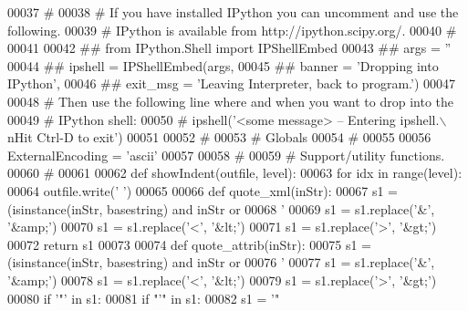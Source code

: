 \begin{DoxyCode}
{{{{00037 \textcolor{comment}{#}
00038 \textcolor{comment}{# If you have installed IPython you can uncomment and use the following.}
00039 \textcolor{comment}{# IPython is available from http://ipython.scipy.org/.}
00040 \textcolor{comment}{#}
00041 
00042 \textcolor{comment}{## from IPython.Shell import IPShellEmbed}
00043 \textcolor{comment}{## args = ''}
00044 \textcolor{comment}{## ipshell = IPShellEmbed(args,}
00045 \textcolor{comment}{##     banner = 'Dropping into IPython',}
00046 \textcolor{comment}{##     exit\_msg = 'Leaving Interpreter, back to program.')}
00047 
00048 \textcolor{comment}{# Then use the following line where and when you want to drop into the}
00049 \textcolor{comment}{# IPython shell:}
00050 \textcolor{comment}{#    ipshell('<some message> -- Entering ipshell.\(\backslash\)nHit Ctrl-D to exit')}
00051 
00052 \textcolor{comment}{#}
00053 \textcolor{comment}{# Globals}
00054 \textcolor{comment}{#}
00055 
00056 ExternalEncoding = \textcolor{stringliteral}{'ascii'}
00057 
00058 \textcolor{comment}{#}
00059 \textcolor{comment}{# Support/utility functions.}
00060 \textcolor{comment}{#}
00061 
00062 \textcolor{keyword}{def }showIndent(outfile, level):
00063     \textcolor{keywordflow}{for} idx \textcolor{keywordflow}{in} range(level):
00064         outfile.write(\textcolor{stringliteral}{'    '})
00065 
00066 \textcolor{keyword}{def }quote_xml(inStr):
00067     s1 = (isinstance(inStr, basestring) \textcolor{keywordflow}{and} inStr \textcolor{keywordflow}{or}
00068           \textcolor{stringliteral}{'%
00069     s1 = s1.replace(\textcolor{stringliteral}{'&'}, \textcolor{stringliteral}{'&amp;'})
00070     s1 = s1.replace(\textcolor{stringliteral}{'<'}, \textcolor{stringliteral}{'&lt;'})
00071     s1 = s1.replace(\textcolor{stringliteral}{'>'}, \textcolor{stringliteral}{'&gt;'})
00072     \textcolor{keywordflow}{return} s1
00073 
00074 \textcolor{keyword}{def }quote_attrib(inStr):
00075     s1 = (isinstance(inStr, basestring) \textcolor{keywordflow}{and} inStr \textcolor{keywordflow}{or}
00076           \textcolor{stringliteral}{'%
00077     s1 = s1.replace(\textcolor{stringliteral}{'&'}, \textcolor{stringliteral}{'&amp;'})
00078     s1 = s1.replace(\textcolor{stringliteral}{'<'}, \textcolor{stringliteral}{'&lt;'})
00079     s1 = s1.replace(\textcolor{stringliteral}{'>'}, \textcolor{stringliteral}{'&gt;'})
00080     \textcolor{keywordflow}{if} \textcolor{stringliteral}{'"'} \textcolor{keywordflow}{in} s1:
00081         \textcolor{keywordflow}{if} \textcolor{stringliteral}{"'"} \textcolor{keywordflow}{in} s1:
00082             s1 = \textcolor{stringliteral}{'"%
}}}}}}}
\end{DoxyCode}
